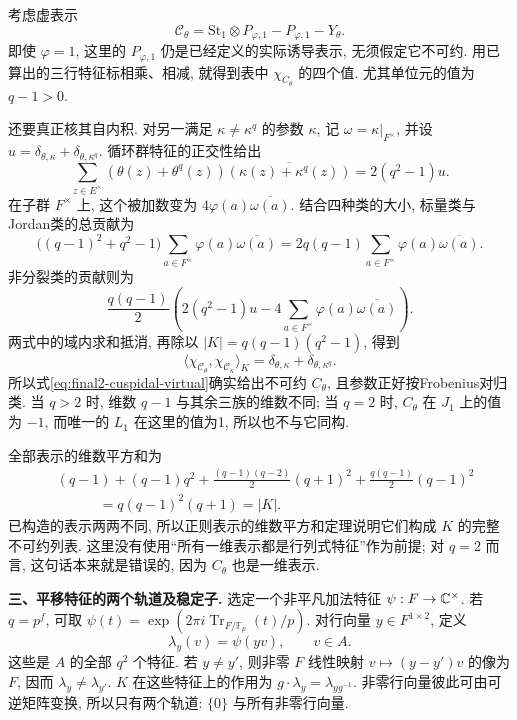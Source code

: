 \begin{solution}
考虑虚表示
\begin{equation}\label{eq:final2-cuspidal-virtual}
 \mathcal C_\theta
 =\mathrm{St}_1\otimes P_{\varphi,1}-P_{\varphi,1}-Y_\theta.
\end{equation}
即使 $\varphi=1$, 这里的 $P_{\varphi,1}$ 仍是已经定义的实际诱导表示, 无须假定它不可约. 用已算出的三行特征标相乘、相减, 就得到表中 $\chi_{C_\theta}$ 的四个值. 尤其单位元的值为 $q-1>0$.

还要真正核其自内积. 对另一满足 $\kappa\ne\kappa^q$ 的参数 $\kappa$, 记 $\omega=\kappa|_{F^\times}$, 并设
$u=\delta_{\theta,\kappa}+\delta_{\theta,\kappa^q}$. 循环群特征的正交性给出
\[
 \sum_{z\in E^\times}
 (\theta(z)+\theta^q(z))\overline{(\kappa(z)+\kappa^q(z))}
 =2(q^2-1)u.
\]
在子群 $F^\times$ 上, 这个被加数变为 $4\varphi(a)\overline{\omega(a)}$. 结合四种类的大小, 标量类与Jordan类的总贡献为
\[
 \bigl((q-1)^2+q^2-1\bigr)
 \sum_{a\in F^\times}\varphi(a)\overline{\omega(a)}
 =2q(q-1)\sum_{a\in F^\times}\varphi(a)\overline{\omega(a)}.
\]
非分裂类的贡献则为
\[
 \frac{q(q-1)}2\left(
 2(q^2-1)u-4\sum_{a\in F^\times}\varphi(a)\overline{\omega(a)}\right).
\]
两式中的域内求和抵消, 再除以 $|K|=q(q-1)(q^2-1)$, 得到
\begin{equation}\label{eq:final2-cuspidal-inner}
 \langle\chi_{\mathcal C_\theta},\chi_{\mathcal C_\kappa}\rangle_K
 =\delta_{\theta,\kappa}+\delta_{\theta,\kappa^q}.
\end{equation}
所以式\eqref{eq:final2-cuspidal-virtual}确实给出不可约 $C_\theta$, 且参数正好按Frobenius对归类. 当 $q>2$ 时, 维数 $q-1$ 与其余三族的维数不同; 当 $q=2$ 时, $C_\theta$ 在 $J_1$ 上的值为 $-1$, 而唯一的 $L_1$ 在这里的值为1, 所以也不与它同构.

全部表示的维数平方和为
\begin{align*}
 &(q-1)+(q-1)q^2
 +\frac{(q-1)(q-2)}2(q+1)^2
 +\frac{q(q-1)}2(q-1)^2\\
 &\hspace{3em}=q(q-1)^2(q+1)=|K|.
\end{align*}
已构造的表示两两不同, 所以正则表示的维数平方和定理说明它们构成 $K$ 的完整不可约列表. 这里没有使用“所有一维表示都是行列式特征”作为前提; 对 $q=2$ 而言, 这句话本来就是错误的, 因为 $C_\theta$ 也是一维表示.

\textbf{三、平移特征的两个轨道及稳定子.}
选定一个非平凡加法特征 $\psi:F\to\mathbb C^\times$. 若 $q=p^f$, 可取
$\psi(t)=\exp(2\pi i\operatorname{Tr}_{F/\mathbb F_p}(t)/p)$.
对行向量 $y\in F^{1\times2}$, 定义
\[
 \lambda_y(v)=\psi(yv),\qquad v\in A.
\]
这些是 $A$ 的全部 $q^2$ 个特征. 若 $y\ne y'$, 则非零 $F$ 线性映射 $v\mapsto(y-y')v$ 的像为 $F$, 因而 $\lambda_y\ne\lambda_{y'}$. $K$ 在这些特征上的作用为 $g\cdot\lambda_y=\lambda_{yg^{-1}}$. 非零行向量彼此可由可逆矩阵变换, 所以只有两个轨道: $\{0\}$ 与所有非零行向量.


\end{solution}
